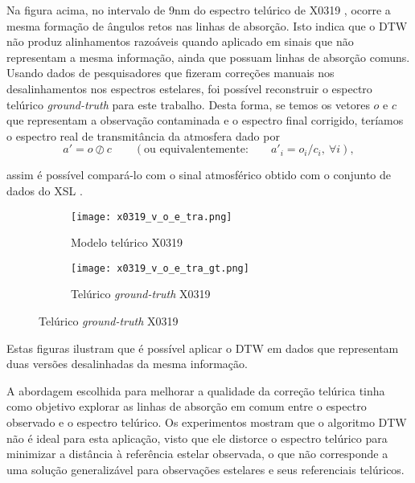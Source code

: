 \documentclass[a1]{sciposter}
\begin{document}
\begin{multicols}{2}
Na figura acima, no intervalo de 9nm do espectro telúrico de X0319 \cite{Chen2014TheXS}, ocorre a mesma formação de ângulos retos nas linhas de absorção. Isto indica que o DTW não produz alinhamentos razoáveis quando aplicado em sinais que não representam a mesma informação, ainda que possuam linhas de absorção comuns.\\

Usando dados de pesquisadores \cite{unpublished-xshooter-data-release} que fizeram correções manuais nos desalinhamentos nos espectros estelares, foi possível reconstruir o espectro telúrico \textit{ground-truth} para este trabalho. Desta forma, se temos os vetores $o$ e $c$ que representam a observação contaminada e o espectro final corrigido, teríamos o espectro real de transmitância da atmosfera dado por
\begin{equation*}
    a' = o \oslash c \qquad \left(\mbox{ou equivalentemente:} \qquad a'_{i} = o_i / c_i,\ \forall i\right),
\end{equation*}

assim é possível compará-lo com o sinal atmosférico obtido com o conjunto de dados do XSL \cite{Chen2014TheXS}.

\begin{figure}
 \centering
 \begin{subfigure}{0.4\textwidth}
  \centering
  \texttt{[image: x0319\_v\_o\_e\_tra.png]}
  \caption{Modelo telúrico X0319}
 \end{subfigure}\hfil
 \begin{subfigure}{0.4\textwidth}
  \centering
  \texttt{[image: x0319\_v\_o\_e\_tra\_gt.png]}
  \caption{Telúrico \textit{ground-truth} X0319}
 \end{subfigure}\hfil
\end{figure}

Estas figuras ilustram que é possível aplicar o DTW em dados que representam duas versões desalinhadas da mesma informação.


A abordagem escolhida para melhorar a qualidade da correção telúrica tinha como objetivo explorar as linhas de absorção em comum entre o espectro observado e o espectro telúrico. Os experimentos mostram que o algoritmo DTW não é ideal para esta aplicação, visto que ele distorce o espectro telúrico para minimizar a distância à referência estelar observada, o que não corresponde a uma solução generalizável para observações estelares e seus referenciais telúricos. 

% 





\end{multicols}
\end{document}
